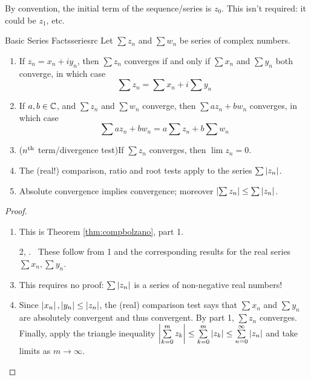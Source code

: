 By convention, the initial term of the sequence/series is $z_0$. This isn't required: it could be $z_1$, etc.

\begin{thm}{Basic Series Facts}{seriesrc}
	Let $\sum z_n$ and $\sum w_n$ be series of complex numbers.
	\begin{enumerate}\itemsep0pt
	  \item If $z_n=x_n+iy_n$, then $\sum z_n$ converges if and only if $\sum x_n$ and $\sum y_n$ both converge, in which case
	  \[
	  	\sum z_n=\sum x_n+i\sum y_n
	  \]
	  \item\vspace{-3pt} If $a,b\in\mathbb{C}$, and $\sum z_n$ and $\sum w_n$ converge, then $\sum az_n+bw_n$ converges, in which case
	  \[
	  	\sum az_n+bw_n=a\sum z_n+b\sum w_n
	  \]
	  \item\vspace{-3pt} ($n\textsuperscript{th}$ term/divergence test)\lstsp If $\sum z_n$ converges, then $\lim z_n=0$.
	  \item The (real!) comparison, ratio and root tests apply to the series $\sum\left| z_n\right|$.
	  \item Absolute convergence implies convergence; moreover $\left| \sum z_n\right|\le\sum\left| z_n\right|$.
	\end{enumerate}
\end{thm}

\begin{proof}
	\begin{enumerate}\itemsep0pt
	  \item This is Theorem \ref{thm:compbolzano}, part 1.
	  \item[2,]. \ These follow from 1 and the corresponding results for the real series $\sum x_n,\sum y_n$.
	  \setcounter{enumi}{3}
	  \item This requires no proof: $\sum \left| z_n\right|$ is a series of non-negative real numbers!
	  \item Since $\left| x_n\right|,\left| y_n\right|\le\left| z_n\right|$, the (real) comparison test says that $\sum x_n$ and $\sum y_n$ are absolutely convergent and thus convergent. By part 1, $\sum z_n$ converges. Finally, apply the triangle inequality $\left| \sum\limits_{k=0}^m z_k\right|\le\sum\limits_{k=0}^m\left| z_k\right|\le\sum\limits_{n=0}^\infty\left| z_n\right|$ and take limits as $m\to\infty$.\qedhere
	\end{enumerate}
\end{proof}

